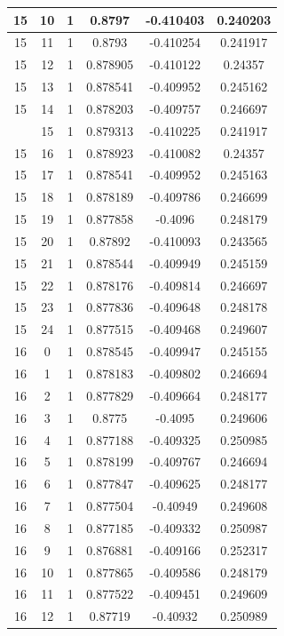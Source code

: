 \documentclass[12pt,a4paper]{article}
\numberwithin{equation}{section}
\numberwithin{figure}{section}
\numberwithin{table}{section}
\begin{document}
\begin{longtable}{|c|c|c|c|c|c|}
15 & 10 & 1 & 0.8797 & -0.410403 & 0.240203 \\ \hline
15 & 11 & 1 & 0.8793 & -0.410254 & 0.241917 \\ \hline
15 & 12 & 1 & 0.878905 & -0.410122 & 0.24357 \\ \hline
15 & 13 & 1 & 0.878541 & -0.409952 & 0.245162 \\ \hline
15 & 14 & 1 & 0.878203 & -0.409757 & 0.246697 \\ \hline
\pagebreak
15 & 15 & 1 & 0.879313 & -0.410225 & 0.241917 \\ \hline
15 & 16 & 1 & 0.878923 & -0.410082 & 0.24357 \\ \hline
15 & 17 & 1 & 0.878541 & -0.409952 & 0.245163 \\ \hline
15 & 18 & 1 & 0.878189 & -0.409786 & 0.246699 \\ \hline
15 & 19 & 1 & 0.877858 & -0.4096 & 0.248179 \\ \hline
15 & 20 & 1 & 0.87892 & -0.410093 & 0.243565 \\ \hline
15 & 21 & 1 & 0.878544 & -0.409949 & 0.245159 \\ \hline
15 & 22 & 1 & 0.878176 & -0.409814 & 0.246697 \\ \hline
15 & 23 & 1 & 0.877836 & -0.409648 & 0.248178 \\ \hline
15 & 24 & 1 & 0.877515 & -0.409468 & 0.249607 \\ \hline
16 & 0 & 1 & 0.878545 & -0.409947 & 0.245155 \\ \hline
16 & 1 & 1 & 0.878183 & -0.409802 & 0.246694 \\ \hline
16 & 2 & 1 & 0.877829 & -0.409664 & 0.248177 \\ \hline
16 & 3 & 1 & 0.8775 & -0.4095 & 0.249606 \\ \hline
16 & 4 & 1 & 0.877188 & -0.409325 & 0.250985 \\ \hline
16 & 5 & 1 & 0.878199 & -0.409767 & 0.246694 \\ \hline
16 & 6 & 1 & 0.877847 & -0.409625 & 0.248177 \\ \hline
16 & 7 & 1 & 0.877504 & -0.40949 & 0.249608 \\ \hline
16 & 8 & 1 & 0.877185 & -0.409332 & 0.250987 \\ \hline
16 & 9 & 1 & 0.876881 & -0.409166 & 0.252317 \\ \hline
16 & 10 & 1 & 0.877865 & -0.409586 & 0.248179 \\ \hline
16 & 11 & 1 & 0.877522 & -0.409451 & 0.249609 \\ \hline
16 & 12 & 1 & 0.87719 & -0.40932 & 0.250989 \\ \hline

\end{longtable}
\end{document}
